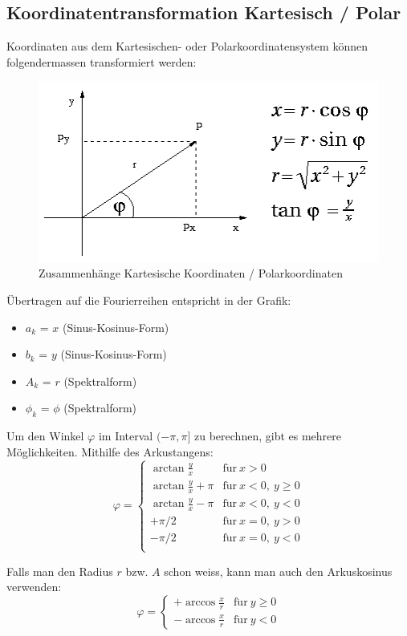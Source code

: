 \documentclass[10pt,a4paper]{scrartcl}
\begin{document}
\subsection{Koordinatentransformation Kartesisch / Polar}

Koordinaten aus dem Kartesischen- oder Polarkoordinatensystem können
folgendermassen transformiert werden:

\begin{figure}[H]
    \centering
    \includegraphics[scale=0.5]{img/Koordinatentransformation.png}
    \caption{Zusammenhänge Kartesische Koordinaten / Polarkoordinaten}
\end{figure}

Übertragen auf die Fourierreihen entspricht in der Grafik:
\begin{itemize}
    \item $a_k$ = $x$ (Sinus-Kosinus-Form)
    \item $b_k$ = $y$ (Sinus-Kosinus-Form)
    \item $A_k$ = $r$ (Spektralform)
    \item $\phi_k$ = $\phi$ (Spektralform)
\end{itemize}

Um den Winkel $\varphi$ im Interval $(-\pi, \pi]$ zu berechnen, gibt es mehrere
Möglichkeiten. Mithilfe des Arkustangens:
$$\varphi = \begin{cases}
\arctan\frac{y}{x} & \mathrm{f\ddot ur}\ x > 0\\
\arctan\frac{y}{x} + \pi & \mathrm{f\ddot ur}\ x < 0,\ y \geq 0\\
\arctan\frac{y}{x} - \pi & \mathrm{f\ddot ur}\ x < 0,\ y < 0\\
+\pi/2 & \mathrm{f\ddot ur}\ x = 0,\ y > 0\\
-\pi/2 & \mathrm{f\ddot ur}\ x = 0,\ y < 0\\
\end{cases}$$

Falls man den Radius $r$ bzw. $A$ schon weiss, kann man auch den Arkuskosinus verwenden:
$$\varphi = \begin{cases}
+\arccos\frac{x}{r} & \mathrm{f\ddot ur}\ y\geq 0\\
-\arccos\frac{x}{r} & \mathrm{f\ddot ur}\ y<0
\end{cases}$$
\end{document}

